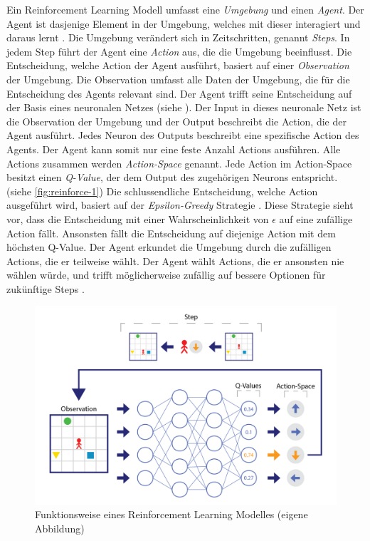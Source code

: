 Ein Reinforcement Learning Modell umfasst eine \emph{Umgebung} und einen
\emph{Agent}. Der Agent ist dasjenige Element in der Umgebung, welches mit
dieser interagiert und daraus lernt \cite[S. 53]{sutton_reinforcement_2014}. Die
Umgebung verändert sich in Zeitschritten, genannt \emph{Steps}. In jedem Step
führt der Agent eine \emph{Action} aus, die die Umgebung beeinflusst. Die
Entscheidung, welche Action der Agent ausführt, basiert auf einer
\emph{Observation} \cite[S. 2]{mnih_playing_2013} der Umgebung. Die
Observation umfasst alle Daten der Umgebung, die für die Entscheidung des Agents
relevant sind. Der Agent trifft seine Entscheidung auf der Basis eines
neuronalen Netzes (siehe ). Der Input in dieses neuronale
Netz ist die Observation der Umgebung und der Output beschreibt die Action, die
der Agent ausführt. Jedes Neuron des Outputs beschreibt eine spezifische Action
des Agents. Der Agent kann somit nur eine feste Anzahl Actions ausführen. Alle
Actions zusammen werden \emph{Action-Space} \cite[S.
67]{sutton_reinforcement_2014} genannt. Jede Action im Action-Space besitzt
einen \emph{Q-Value}, der dem Output des zugehörigen Neurons entspricht. (siehe
\autoref{fig:reinforce-1}) \cite{wang_deep_2021} Die schlussendliche Entscheidung, welche
Action ausgeführt wird, basiert auf der \emph{Epsilon-Greedy} Strategie \cite[S.
34]{sutton_reinforcement_2014}. Diese Strategie sieht vor, dass die Entscheidung
mit einer Wahrscheinlichkeit von $\epsilon$ auf eine zufällige Action fällt.
Ansonsten fällt die Entscheidung auf diejenige Action mit dem höchsten Q-Value.
Der Agent erkundet die Umgebung durch die zufälligen Actions, die er teilweise
wählt. Der Agent wählt Actions, die er ansonsten nie wählen würde, und trifft
möglicherweise zufällig auf bessere Optionen für zukünftige Steps
\cite{rajendra_koppula_exploration_nodate}.

\begin{figure}[!ht]
    \centering
    \includegraphics[width=\textwidth]{images/theorie/reinforce-1.png}
    \caption{Funktionsweise eines Reinforcement Learning Modelles (eigene Abbildung)}
    \label{fig:reinforce-1}
\end{figure}

